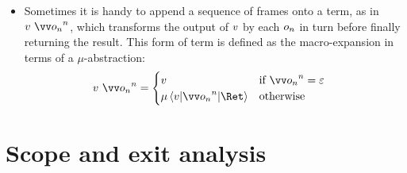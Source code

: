 \documentclass{article}
\begin{document}
\begin{itemize}
\item
  Sometimes it is handy to append a sequence of frames onto a term, as in
  $\tm ~ \vect[n]{\frm_n}$, which transforms the output of $v$ by each
  $o_n$ in turn before finally returning the result.  This form of term is
  defined as the macro-expansion in terms of a $\mu$-abstraction:
  \begin{align*}
    \tm ~ \vect[n]{\frm_n}
    &=
    \begin{cases}
      \tm & \text{if } \vect[n]{\frm_n} = \mt
      \\
      \comp{r}\braket{\tm | \vect[n]{\frm_n} | \ret r} & \text{otherwise}
    \end{cases}
  \end{align*}
\end{itemize}

\section{Scope and exit analysis}
\label{sec:scope-analysis}
\end{document}
